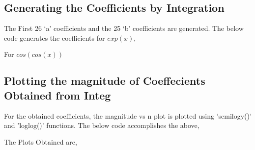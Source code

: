 \documentclass[12pt, a4paper]{report}
\begin{document}
\subsection{Generating the Coefficients by Integration}
The First 26 ‘a’ coefficients and the  25 ‘b’ coefficients are generated. The below code generates the coefficients for $exp(x)$,

For $cos(cos(x))$

 

\subsection{Plotting the magnitude of Coeffecients Obtained from Integ}
For the obtained coefficients, the magnitude vs n plot is plotted using {\selectfont
'semilogy()'
} and {\selectfont
'loglog()'
} functions. The below code accomplishes the above,
\vspace{4mm}

The Plots Obtained are,
\vspace{25mm}
\end{document}
